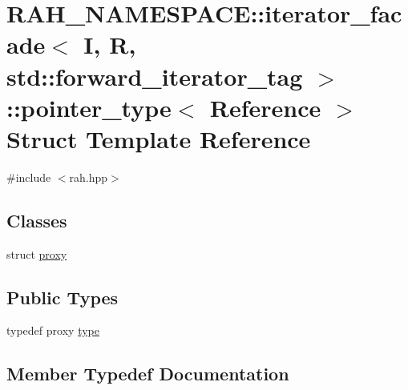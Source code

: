 \hypertarget{struct_r_a_h___n_a_m_e_s_p_a_c_e_1_1iterator__facade_3_01_i_00_01_r_00_01std_1_1forward__iterator__tag_01_4_1_1pointer__type}{}\section{R\+A\+H\+\_\+\+N\+A\+M\+E\+S\+P\+A\+CE\+::iterator\+\_\+facade$<$ I, R, std\+::forward\+\_\+iterator\+\_\+tag $>$\+::pointer\+\_\+type$<$ Reference $>$ Struct Template Reference}
\label{struct_r_a_h___n_a_m_e_s_p_a_c_e_1_1iterator__facade_3_01_i_00_01_r_00_01std_1_1forward__iterator__tag_01_4_1_1pointer__type}


{\ttfamily \#include $<$rah.\+hpp$>$}

\subsection*{Classes}
\begin{DoxyCompactItemize}
\item 
struct \mbox{\hyperlink{struct_r_a_h___n_a_m_e_s_p_a_c_e_1_1iterator__facade_3_01_i_00_01_r_00_01std_1_1forward__iterato3fe5d6b1f3640cd0444b883f952b0798}{proxy}}
\end{DoxyCompactItemize}
\subsection*{Public Types}
\begin{DoxyCompactItemize}
\item 
typedef proxy \mbox{\hyperlink{struct_r_a_h___n_a_m_e_s_p_a_c_e_1_1iterator__facade_3_01_i_00_01_r_00_01std_1_1forward__iterator__tag_01_4_1_1pointer__type_ac9b6d863dcd7e0b5b89830a56c4c34f8}{type}}
\end{DoxyCompactItemize}


\subsection{Member Typedef Documentation}
\mbox{\label{struct_r_a_h___n_a_m_e_s_p_a_c_e_1_1iterator__facade_3_01_i_00_01_r_00_01std_1_1forward__iterator__tag_01_4_1_1pointer__type_ac9b6d863dcd7e0b5b89830a56c4c34f8}} 
